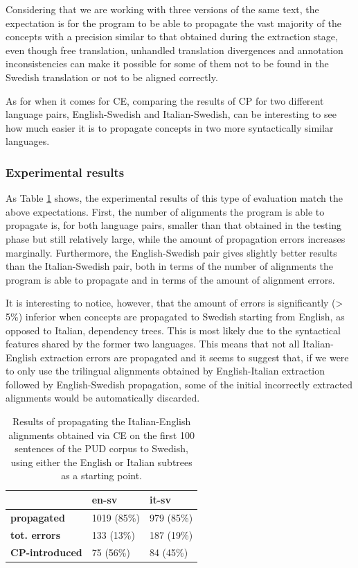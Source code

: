 Considering that we are working with three versions of the same text, the expectation is for the program to be able to propagate the vast majority of the concepts with a precision similar to that obtained during the extraction stage, even though free translation, unhandled translation divergences and annotation inconsistencies can make it possible for some of them not to be found in the Swedish translation or not to be aligned correctly. \smallskip

As for when it comes for CE, comparing the results of CP for two different language pairs, English-Swedish and Italian-Swedish, can be interesting to see how much easier it is to propagate concepts in two more syntactically similar languages.

\subsubsection{Experimental results}
As Table \ref{tcp1} shows, the experimental results of this type of evaluation match the above expectations. First, the number of alignments the program is able to propagate is, for both language pairs, smaller than that obtained in the testing phase but still relatively large, while the amount of propagation errors increases marginally. Furthermore, the English-Swedish pair gives slightly better results than the Italian-Swedish pair, both in terms of the number of alignments the program is able to propagate and in terms of the amount of alignment errors. \smallskip

It is interesting to notice, however, that the amount of errors is significantly (> 5\%) inferior when concepts are propagated to Swedish starting from English, as opposed to Italian, dependency trees. This is most likely due to the syntactical features shared by the former two languages. This means that not all Italian-English extraction errors are propagated and it seems to suggest that, if we were to only use the trilingual alignments obtained by English-Italian extraction followed by English-Swedish propagation, some of the initial incorrectly extracted alignments would be automatically discarded.

\begin{table}[H]
    \centering
    \begin{tabular}{|l|l|l|}
    \hline
    \textbf{}              & \textbf{en-sv} & \textbf{it-sv} \\ \hline
    \textbf{propagated}             & 1019 (85\%) & 979 (85\%) \\ \hline
    \textbf{tot. errors}            & 133 (13\%)  & 187 (19\%)  \\ \hline
    \textbf{CP-introduced}          & 75 (56\%)   & 84 (45\%)   \\ \hline
    \end{tabular}
    \caption[Performance of CP Scenario 1 on manually annotated data]{Results of propagating the Italian-English alignments obtained via CE on the first 100 sentences of the PUD corpus to Swedish, using either the English or Italian subtrees as a starting point.}
    \label{tcp1}
    \end{table}


